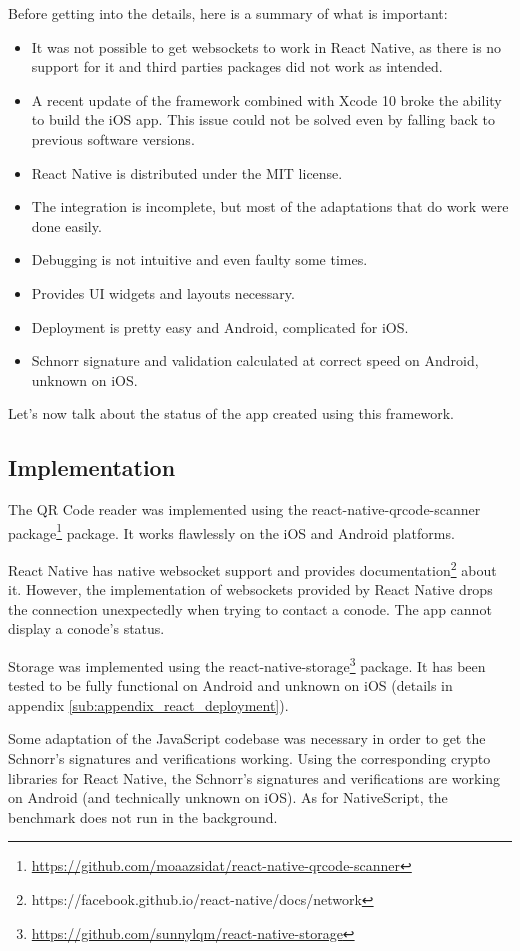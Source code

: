 \documentclass[11pt, a4paper, twoside, openright]{article} %
\begin{document}
{Before getting into the details, here is a summary of what is important:
\begin{itemize}
	\item It was not possible to get websockets to work in React Native, as there is no support for it and third parties packages did not work as intended.
	\item A recent update of the framework combined with Xcode 10 broke the ability to build the iOS app. This issue could not be solved even by falling back to previous software versions.
	\item React Native is distributed under the MIT license.
	\item The integration is incomplete, but most of the adaptations that do work were done easily.
	\item Debugging is not intuitive and even faulty some times.
	\item Provides UI widgets and layouts necessary.
	\item Deployment is pretty easy and Android, complicated for iOS.
	\item Schnorr signature and validation calculated at correct speed on Android, unknown on iOS.
\end{itemize}

Let's now talk about the status of the app created using this framework.

\subsection{Implementation}
The QR Code reader was implemented using the react-native-qrcode-scanner package\footnote{\url{https://github.com/moaazsidat/react-native-qrcode-scanner}} package. It works flawlessly on the iOS and Android platforms.

\label{sub:react_conode_status}
React Native has native websocket support and provides documentation\footnote{https://facebook.github.io/react-native/docs/network} about it. However, the implementation of websockets provided by React Native drops the connection unexpectedly when trying to contact a conode. The app cannot display a conode's status.

Storage was implemented using the react-native-storage\footnote{\url{https://github.com/sunnylqm/react-native-storage}} package. It has been tested to be fully functional on Android and unknown on iOS (details in appendix \ref{sub:appendix_react_deployment}).

Some adaptation of the JavaScript codebase was necessary in order to get the Schnorr's signatures and verifications working. Using the corresponding crypto libraries for React Native, the Schnorr's signatures and verifications are working on Android (and technically unknown on iOS). As for NativeScript, the benchmark does not run in the background.

}
\end{document}
